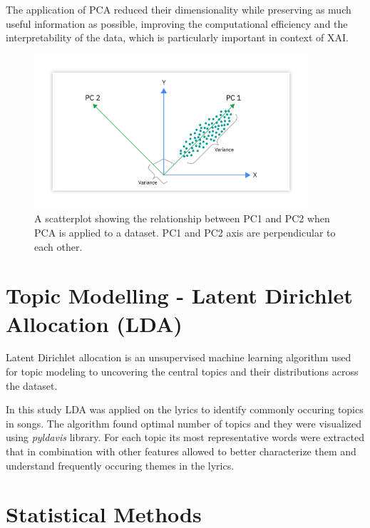 The application of PCA reduced their dimensionality while preserving as much
useful information as possible, improving the computational efficiency and 
the interpretability of the data, which is particularly important in context of
XAI.

\begin{center}
\begin{figure}[H]
  \centering
  \includegraphics[width=4in]{img/pca.png}
  \caption{A scatterplot showing the relationship between PC1 and PC2 when PCA
  is applied to a dataset. PC1 and PC2 axis are perpendicular to each other.\cite{pca}}
  \label{Figure:fig_beh}
\end{figure}
\end{center}


\section{Topic Modelling - Latent Dirichlet Allocation (LDA)}
\label{sec:topicmodelling}

Latent Dirichlet allocation is an unsupervised machine learning algorithm used
for topic modeling to uncovering the central topics and their distributions
across the dataset.\cite{lda}

In this study LDA was applied on the lyrics to identify commonly occuring
topics in songs. The algorithm found optimal number of topics and they were
visualized using \textit{pyldavis}\cite{pylda} library. For each topic its most
representative words were extracted that in combination with other features
allowed to better characterize them and understand frequently occuring themes
in the lyrics.



\section{Statistical Methods}
\label{sec:statisticalmethods}

